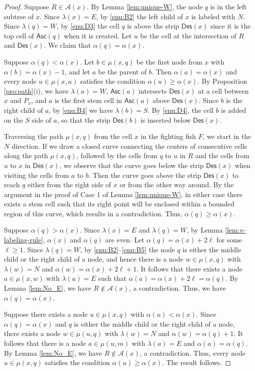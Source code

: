\documentclass[a4paper,11pt,reqno]{amsart}
\theoremstyle{definition}
\numberwithin{equation}{section}
\newcommand{\A}{{\mathcal{A}}}
\newcommand{\Des}{{\textsf{Des}}}
\newcommand{\Asc}{{\textsf{Asc}}}
\begin{document}
\begin{proof} 
Suppose $R\in\A(x)$. By Lemma \ref{lem:unique-W}, the node $q$ is in the left subtree of $x$. Since $\lambda(x)=E$, by \ref{enu:B2} the left child of $x$ is labeled with $N$. Since $\lambda(q)=W$, by \ref{enu:D3} the cell $q$ is above the strip $\Des(x)$ since it is the top cell of $\Asc(q)$ when it is created. Let $u$ be the cell at the intersection of $R$ and $\Des(x)$. We claim that $\alpha(q)=\alpha(x)$. 

Suppose $\alpha(q)<\alpha(x)$. Let $b\in\mu(x,q)$ be the first node from $x$ with $\alpha(b)=\alpha(x)-1$, and let $a$ be the parent of $b$. Then $\alpha(a)=\alpha(x)$ and every node $u\in\mu(x,a)$ satisfies the condition $\alpha(u)\ge\alpha(x)$. By Proposition \ref{pro:path}(i), we have $\lambda(a)=W$, $\Asc(a)$ intersects $\Des(x)$ at a cell between $x$ and $P_x$, and $a$ is the first stem cell in $\Asc(a)$ above $\Des(x)$. Since $b$ is the right child of $a$, by \ref{enu:B4} we have $\lambda(b)=S$. By \ref{enu:D4}, the cell $b$ is added on the $S$ side of $a$, so that the strip $\Des(b)$ is inserted below $\Des(x)$. 

Traversing the path $\mu(x,q)$ from the cell $x$ in the fighting fish $F$, we start in the $N$ direction. If we draw a closed curve connecting the centers of consecutive cells along the path $\mu(x,q)$, followed by the cells from $q$ to $u$ in $R$ and the cells from $u$ to $x$ in $\Des(x)$, we observe that the curve goes below the strip $\Des(x)$ when visiting the cells from $a$ to $b$. Then the curve goes above the strip $\Des(x)$ to reach $q$ either from the right side of $x$ or from the other way around. By the argument in the proof of Case 1 of Lemma \ref{lem:unique-W}, in either case there exists a stem cell such that its right point  will be enclosed within a bounded region of this curve, which results in a contradiction. Thus, $\alpha(q)\geq\alpha(x)$.


Suppose $\alpha(q)>\alpha(x)$. Since $\lambda(x)=E$ and $\lambda(q)=W$, by Lemma \ref{lem:v-labeling-rule}, $\alpha(x)$ and $\alpha(q)$ are even. Let $\alpha(q)=\alpha(x)+2\ell$ for some $\ell\ge 1$. Since $\lambda(q)=W$, by \ref{enu:B2}--\ref{enu:B5} the node $q$ is either the middle child or the right child of a node, and hence there is a node $w\in\mu(x,q)$ with $\lambda(w)=N$ and $\alpha(w)=\alpha(x)+2\ell+1$. It follows that there exists a node $a\in\mu(x,w)$ with $\lambda(a)=E$ such that $\alpha(a)=\alpha(x)+2\ell=\alpha(q)$. By Lemma \ref{lem:No_E}, we have $R\not\in\A(x)$, a contradiction. Thus, we have $\alpha(q)=\alpha(x)$.



Suppose there exists a node $u\in\mu(x,q)$ with $\alpha(u)<\alpha(x)$. Since $\alpha(q)=\alpha(x)$ and $q$ is either the middle child or the right child of a node, there exists a node $w\in\mu(u,q)$ with $\lambda(w)=N$ and $\alpha(w)=\alpha(q)+1$. It follows that there is a node $a\in\mu(u,m)$ with $\lambda(a)=E$ and $\alpha(a)=\alpha(q)$. By Lemma \ref{lem:No_E}, we have $R\not\in\A(x)$, a contradiction. Thus, every node $u\in\mu(x,q)$ satisfies the condition $\alpha(u)\geq\alpha(x)$.  The result follows.
\end{proof}
\end{document}
